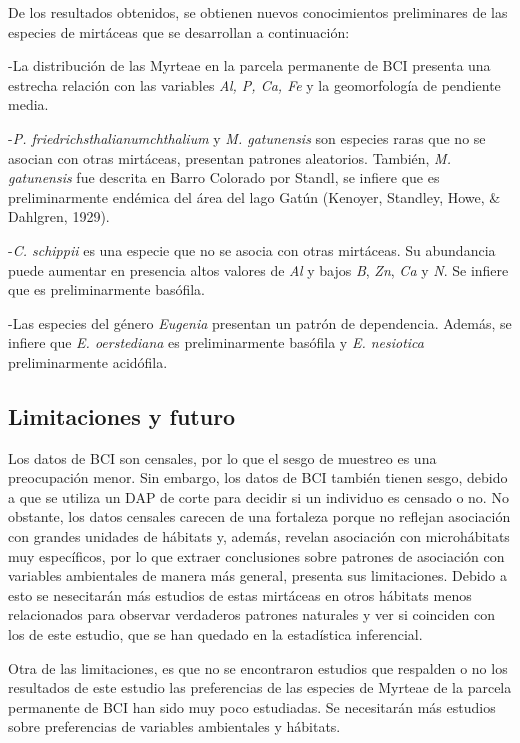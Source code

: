 \documentclass[11pt,]{article}
\begin{document}
De los resultados obtenidos, se obtienen nuevos conocimientos
preliminares de las especies de mirtáceas que se desarrollan a
continuación:

-La distribución de las Myrteae en la parcela permanente de BCI presenta
una estrecha relación con las variables \emph{Al, P, Ca, Fe} y la
geomorfología de pendiente media.

-\emph{P. friedrichsthalianumchthalium} y \emph{M. gatunensis} son
especies raras que no se asocian con otras mirtáceas, presentan patrones
aleatorios. También, \emph{M. gatunensis} fue descrita en Barro Colorado
por Standl, se infiere que es preliminarmente endémica del área del lago
Gatún (Kenoyer, Standley, Howe, \& Dahlgren, 1929).

-\emph{C. schippii} es una especie que no se asocia con otras mirtáceas.
Su abundancia puede aumentar en presencia altos valores de \emph{Al} y
bajos \emph{B}, \emph{Zn}, \emph{Ca} y \emph{N}. Se infiere que es
preliminarmente basófila.

-Las especies del género \emph{Eugenia} presentan un patrón de
dependencia. Además, se infiere que \emph{E. oerstediana} es
preliminarmente basófila y \emph{E. nesiotica} preliminarmente
acidófila.

\subsection{Limitaciones y futuro}\label{limitaciones-y-futuro}

Los datos de BCI son censales, por lo que el sesgo de muestreo es una
preocupación menor. Sin embargo, los datos de BCI también tienen sesgo,
debido a que se utiliza un DAP de corte para decidir si un individuo es
censado o no. No obstante, los datos censales carecen de una fortaleza
porque no reflejan asociación con grandes unidades de hábitats y,
además, revelan asociación con microhábitats muy específicos, por lo que
extraer conclusiones sobre patrones de asociación con variables
ambientales de manera más general, presenta sus limitaciones. Debido a
esto se nesecitarán más estudios de estas mirtáceas en otros hábitats
menos relacionados para observar verdaderos patrones naturales y ver si
coinciden con los de este estudio, que se han quedado en la estadística
inferencial.

Otra de las limitaciones, es que no se encontraron estudios que
respalden o no los resultados de este estudio las preferencias de las
especies de Myrteae de la parcela permanente de BCI han sido muy poco
estudiadas. Se necesitarán más estudios sobre preferencias de variables
ambientales y hábitats.
\end{document}
